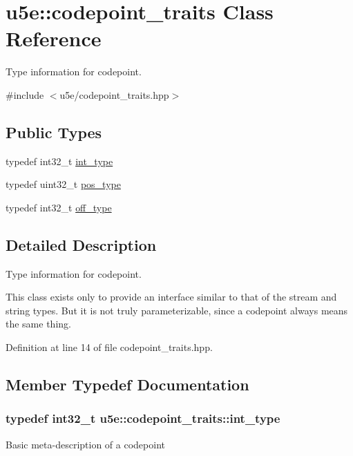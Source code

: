 \hypertarget{classu5e_1_1codepoint__traits}{}\section{u5e\+:\+:codepoint\+\_\+traits Class Reference}
\label{classu5e_1_1codepoint__traits}


Type information for codepoint.  




{\ttfamily \#include $<$u5e/codepoint\+\_\+traits.\+hpp$>$}

\subsection*{Public Types}
{\bf }\par
\begin{DoxyCompactItemize}
\item 
typedef int32\+\_\+t \hyperlink{classu5e_1_1codepoint__traits_a11f00d20915e28671519ef0c96fab05d}{int\+\_\+type}
\item 
typedef uint32\+\_\+t \hyperlink{classu5e_1_1codepoint__traits_afb5588dd802b42f267a6c254ad7842f1}{pos\+\_\+type}
\item 
typedef int32\+\_\+t \hyperlink{classu5e_1_1codepoint__traits_ab169bad68f239d5248f82749a2962346}{off\+\_\+type}
\end{DoxyCompactItemize}



\subsection{Detailed Description}
Type information for codepoint. 

This class exists only to provide an interface similar to that of the stream and string types. But it is not truly parameterizable, since a codepoint always means the same thing. 

Definition at line 14 of file codepoint\+\_\+traits.\+hpp.



\subsection{Member Typedef Documentation}
\subsubsection[{\texorpdfstring{int\+\_\+type}{int_type}}]{\setlength{\rightskip}{0pt plus 5cm}typedef int32\+\_\+t {\bf u5e\+::codepoint\+\_\+traits\+::int\+\_\+type}}\hypertarget{classu5e_1_1codepoint__traits_a11f00d20915e28671519ef0c96fab05d}{}\label{classu5e_1_1codepoint__traits_a11f00d20915e28671519ef0c96fab05d}
Basic meta-\/description of a codepoint 

